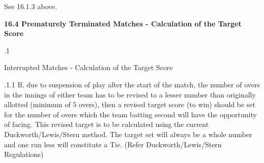 \documentclass[12pt]{article}
\begin{document}
\vspace{\baselineskip}
\begin{adjustwidth}{0.5in}{0.0in}
{\fontsize{9pt}{10.8pt}\selectfont See 16.1.3 above.\par}\par

\end{adjustwidth}


\vspace{\baselineskip}
{\fontsize{11pt}{13.2pt}\selectfont \textbf{16.4 \tabto{0.47in} Prematurely Terminated Matches - Calculation of the Target Score}\par}\par


\vspace{\baselineskip}
{\fontsize{9pt}{10.8pt}.1 \tabto{0.49in} {\fontsize{8pt}{9.6pt}\selectfont Interrupted Matches - Calculation of the Target Score\par}\par}\par


\vspace{\baselineskip}

\vspace{\baselineskip}

\vspace{\baselineskip}

\vspace{\baselineskip}
\begin{Center}
{\fontsize{8pt}{9.6pt}\par}
\end{Center}\par


\vspace{\baselineskip}

\vspace{\baselineskip}
\begin{adjustwidth}{1.18in}{0.0in}
{\fontsize{9pt}{10.8pt}.1.1 \tabto{1.17in} If, due to suspension of play after the start of the match, the number of overs in the innings of either team has to be revised to a lesser number than originally allotted (minimum of 5 overs), then a revised target score (to win) should be set for the number of overs which the team batting second will have the opportunity of facing. This revised target is to be calculated using the current Duckworth/Lewis/Stern method. The target set will always be a whole number and one run less will constitute a Tie. (Refer Duckworth/Lewis/Stern Regulations)\par}\par

\end{adjustwidth}
\end{document}
